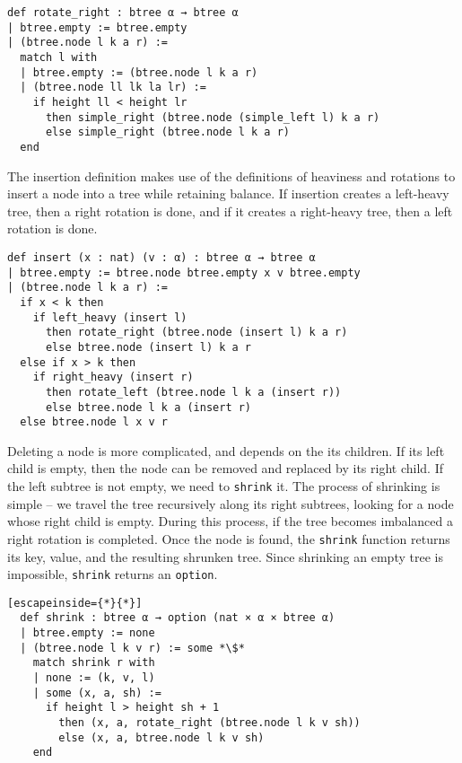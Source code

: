 \begin{lstlisting}
def rotate_right : btree α → btree α
| btree.empty := btree.empty
| (btree.node l k a r) :=
  match l with
  | btree.empty := (btree.node l k a r)
  | (btree.node ll lk la lr) :=
    if height ll < height lr 
      then simple_right (btree.node (simple_left l) k a r)
      else simple_right (btree.node l k a r)
  end 
\end{lstlisting}

The insertion definition makes use of the definitions of heaviness and rotations to insert a node into a tree while retaining balance. If insertion creates a left-heavy tree, then a right rotation is done, and if it creates a right-heavy tree, then a left rotation is done.

\begin{lstlisting}
def insert (x : nat) (v : α) : btree α → btree α
| btree.empty := btree.node btree.empty x v btree.empty
| (btree.node l k a r) :=
  if x < k then 
    if left_heavy (insert l) 
      then rotate_right (btree.node (insert l) k a r)
      else btree.node (insert l) k a r
  else if x > k then
    if right_heavy (insert r) 
      then rotate_left (btree.node l k a (insert r))
      else btree.node l k a (insert r)
  else btree.node l x v r
\end{lstlisting}  

Deleting a node is more complicated, and depends on the its children. If its left child is empty, then the node can be removed and replaced by its right child. If the left subtree is not empty, we need to \lstinline{shrink} it. The process of shrinking is simple -- we travel the tree recursively along its right subtrees, looking for a node whose right child is empty. During this process, if the tree becomes imbalanced a right rotation is completed. Once the node is found, the \lstinline{shrink} function returns its key, value, and the resulting shrunken tree. Since shrinking an empty tree is impossible, \lstinline{shrink} returns an \lstinline{option}.

\begin{lstlisting}[escapeinside={*}{*}]
  def shrink : btree α → option (nat × α × btree α)
  | btree.empty := none
  | (btree.node l k v r) := some *\$*
    match shrink r with
    | none := (k, v, l)
    | some (x, a, sh) :=
      if height l > height sh + 1
        then (x, a, rotate_right (btree.node l k v sh))
        else (x, a, btree.node l k v sh)
    end
  \end{lstlisting}


